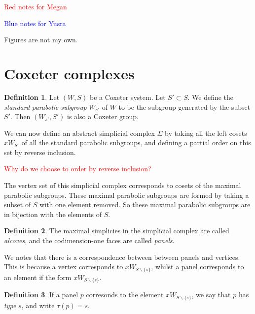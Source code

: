 \documentclass[12pt]{article}
\begin{document}
\newtheorem{theorem}{Theorem}
\theoremstyle{definition}
\newtheorem{definition}{Definition}
\newtheorem{example}{Example}
\newtheorem{lemma}{Lemma}
\newtheorem{corollary}{Corollary}
\newcommand{\uw}{\mathcal{U}(W,X)}
\newcommand{\W}{$(W,S)$}
\newcommand{\ix}{\textit}
\newcommand{\tr}{\textcolor{red}}
\newcommand{\sg}{$\Sigma$}
\tableofcontents 



\textcolor{red}{Red notes for Megan}

\textcolor{blue}{Blue notes for Yusra}

Figures are not my own.

\section{Coxeter complexes}
\begin{definition}
    Let $(W,S)$ be a Coxeter system. Let $S'\subset S$. We define the \textit{standard parabolic subgroup} $W_{s'}$ of $W$ to be the subgroup generated by the subset $S'$. Then $(W_{s'},S')$ is also a Coxeter group. 
\end{definition}

We can now define an abstract simplicial complex $\Sigma$ by taking all the left cosets $xW_{S'}$ of all the standard parabolic subgroups, and defining a partial order on this set by reverse inclusion. 

\textcolor{red}{Why do we choose to order by reverse inclusion?}

The vertex set of this simplicial complex corresponds to cosets of the maximal parabolic subgroups. These maximal parabolic subgroups are formed by taking a subset of $S$ with one element removed. So these maximal parabolic subgroups are in bijection with the elements of $S$. 


\begin{definition}
    The maximal simplicies in the simplicial complex are called \textit{alcoves}, and the codimension-one faces are called \textit{panels}.  
\end{definition}

We notes that there is a correspondence between between panels and vertices. This is because a vertex corresponds to $xW_{S\backslash \{s\}}$, whilst a panel corresponds to an element if the form $xW_{S\backslash \{s\}}$. 

\begin{definition}
    If a panel $p$ corresonds to the element $xW_{S\backslash \{s\}}$, we say that $p$ has \ix{type} $s$, and write $\tau(p)=s$. 
\end{definition}
\end{document}

